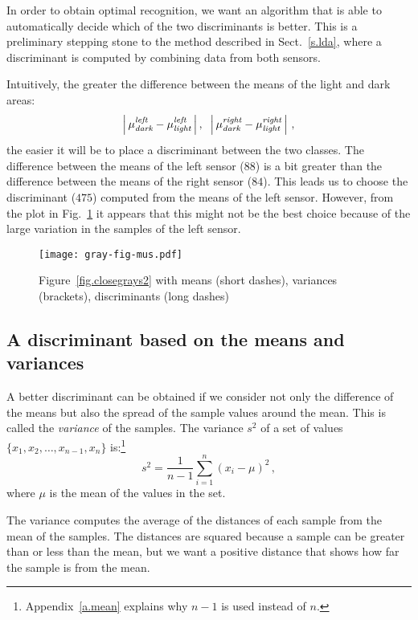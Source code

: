 In order to obtain optimal recognition, we want an algorithm that is able to automatically decide which of the two discriminants is better. This is a preliminary stepping stone to the method described in Sect.~\ref{s.lda}, where a discriminant is computed by combining data from both sensors.

Intuitively, the greater the difference between the means of the light and dark areas:
\[
\left|\,\mu_{\textit{\scriptsize dark}}^{\textit{\scriptsize left}} - \mu_{\textit{\scriptsize light}}^{\textit{\scriptsize left}}\,\right|,\;\;\left|\,\mu_{\textit{\scriptsize dark}}^{\textit{\scriptsize right}} - \mu_{\textit{\scriptsize light}}^{\textit{\scriptsize right}}\,\right|\,,
\]
the easier it will be to place a discriminant between the two classes. The difference between the means of the left sensor ($88$) is a bit greater than the difference between the means of the right sensor ($84$). This leads us to choose the discriminant ($475$) computed from the means of the left sensor. However, from the plot in Fig.~\ref{fig.closegraysmus} it appears that this might not be the best choice because of the large variation in the samples of the left sensor.

\begin{figure}
\begin{center}
\texttt{[image: gray-fig-mus.pdf]}
\end{center}
\caption{Figure~\ref{fig.closegrays2} with means (short dashes), variances (brackets), discriminants (long dashes)}\label{fig.closegraysmus}
\end{figure}

\subsection{A discriminant based on the means and variances}

A better discriminant can be obtained if we consider not only the difference of the means but also the spread of the sample values around the mean. This is called the \emph{variance} of the samples. The variance $s^2$ of a set of values $\{x_1,x_2,\ldots,x_{n-1},x_n\}$ is:\footnote{Appendix~\ref{a.mean} explains why $n-1$ is used instead of $n$.}
\[
s^2 = \frac{1}{n-1} \sum_{i=1}^n (x_i-\mu)^2\,,
\]
where $\mu$ is the mean of the values in the set.

The variance computes the average of the distances of each sample from the mean of the samples. The distances are squared because a sample can be greater than or less than the mean, but we want a positive distance that shows how far the sample is from the mean.

